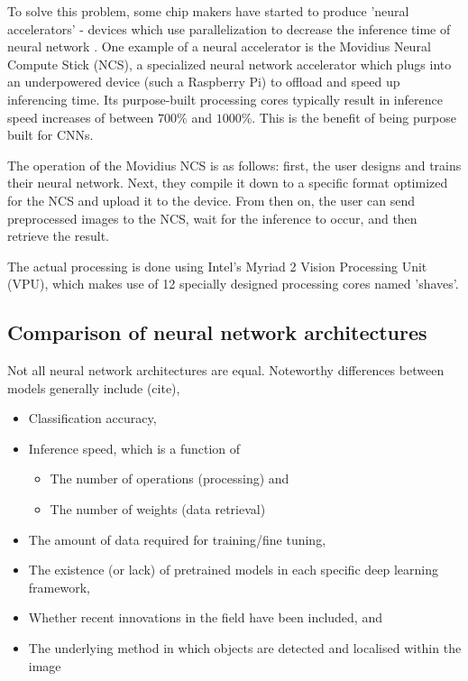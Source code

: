 
To solve this problem, some chip makers have started to produce 'neural accelerators' - devices which use parallelization to decrease the inference time of neural network \cite{website:movidius_ncs}. One example of a neural accelerator is the Movidius Neural Compute Stick (NCS), a specialized neural network accelerator which plugs into an underpowered device (such a Raspberry Pi) to offload and speed up inferencing time. Its purpose-built processing cores typically result in inference speed increases of between $700\%$ and $1000\%$. This is the benefit of being purpose built for CNNs.

The operation of the Movidius NCS is as follows: first, the user designs and trains their neural network. Next, they compile it down to a specific format optimized for the NCS and upload it to the device. From then on, the user can send preprocessed images to the NCS, wait for the inference to occur, and then retrieve the result.

The actual processing is done using Intel's Myriad 2 Vision Processing Unit (VPU), which makes use of 12 specially designed processing cores named 'shaves'.


\iffalse
\subsection{Comparison of neural network architectures}
Not all neural network architectures are equal. Noteworthy differences between models generally include {\color{red} (cite)},

\begin{itemize}
	\item Classification accuracy,
	\item Inference speed, which is a function of
	\begin{itemize}
		\item The number of operations (processing) and
		\item The number of weights (data retrieval)
	\end{itemize}
	\item The amount of data required for training/fine tuning,
	\item The existence (or lack) of pretrained models in each specific deep learning framework,
	\item Whether recent innovations in the field have been included, and
	\item The underlying method in which objects are detected and localised within the image
\end{itemize}

